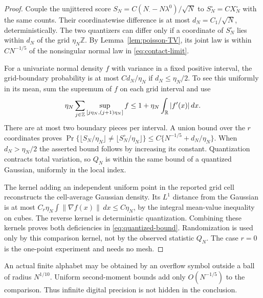 \begin{proof}
Couple the unjittered score $S_N=C(N_\cdot-N\lambda^0)/\sqrt N$ to $S_N^\circ=CX_N^\circ$ with the same counts. Their coordinatewise difference is at most $d_N=C_1/\sqrt N$, deterministically. The two quantizers can differ only if a coordinate of $S_N^\circ$ lies within $d_N$ of the grid $\eta_N\mathbb Z$. By Lemma~\ref{lem:poisson-TV}, its joint law is within $C N^{-1/5}$ of the nonsingular normal law in \eqref{eq:contact-limit}.

For a univariate normal density $f$ with variance in a fixed positive interval, the grid-boundary probability is at most $C d_N/\eta_N$ if $d_N\le\eta_N/2$. To see this uniformly in its mean, sum the supremum of $f$ on each grid interval and use
\[
 \eta_N\sum_{j\in\mathbb Z}\sup_{[j\eta_N,(j+1)\eta_N]}f
       \le 1+\eta_N\int_{\mathbb R}|f'(x)|\,dx.
\]
There are at most two boundary pieces per interval. A union bound over the $r$ coordinates proves
$\Pr\{\lfloor S_N/\eta_N\rfloor\ne
       \lfloor S_N^\circ/\eta_N\rfloor\}
 \le C\{N^{-1/5}+d_N/\eta_N\}$.
When $d_N>\eta_N/2$ the asserted bound follows by increasing its constant. Quantization contracts total variation, so $Q_N$ is within the same bound of a quantized Gaussian, uniformly in the local index.

The kernel adding an independent uniform point in the reported grid cell reconstructs the cell-average Gaussian density. Its $L^1$ distance from the Gaussian is at most
$C_r\eta_N\int\|\nabla f(x)\|\,dx\le C\eta_N$,
by the integral mean-value inequality on cubes. The reverse kernel is deterministic quantization. Combining these kernels proves both deficiencies in \eqref{eq:quantized-bound}. Randomization is used only by this comparison kernel, not by the observed statistic $Q_N$. The case $r=0$ is the one-point experiment and needs no mesh.
\end{proof}
An actual finite alphabet may be obtained by an overflow symbol outside a ball of radius $N^{1/10}$. Uniform second-moment bounds add only $O(N^{-1/5})$ to the comparison. Thus infinite digital precision is not hidden in the conclusion.


